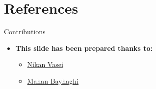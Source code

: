 \documentclass[serif, aspectratio=169]{beamer}
\begin{document}
\section{References}

\begin{frame}{Contributions}
    \begin{itemize}
    \itemsep1em
    \justifying
        \item \textbf{This slide has been prepared thanks to:}
    \begin{itemize}
        \itemsep1em
        \item \href{https://github.com/NikanV/}{Nikan Vasei}
        \item \href{https://github.com/Mahan-Bayhaghi}{Mahan Bayhaghi}
    \end{itemize}
    \end{itemize}
\end{frame}

\begin{frame}[allowframebreaks]
    
    
    \nocite{*}
\end{frame}
\end{document}
